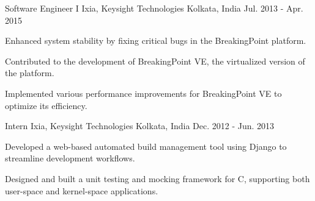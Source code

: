 \begin{cventries}
\cventry
{Software Engineer I} %
{Ixia, Keysight Technologies} %
{Kolkata, India} %
{Jul. 2013 - Apr. 2015} %
{\begin{cvitems} %
		\item {Enhanced system stability by fixing critical bugs in the BreakingPoint platform.}
		\item {Contributed to the development of BreakingPoint VE, the virtualized version of the platform.}
		\item {Implemented various performance improvements for BreakingPoint VE to optimize its efficiency.}
\end{cvitems}}

\cventry
{Intern} %
{Ixia, Keysight Technologies} %
{Kolkata, India} %
{Dec. 2012 - Jun. 2013} %
{\begin{cvitems} %
		\item {Developed a web-based automated build management tool using Django to streamline development workflows.}
		\item {Designed and built a unit testing and mocking framework for C, supporting both user-space and kernel-space applications.}
\end{cvitems}}

	
\end{cventries}
